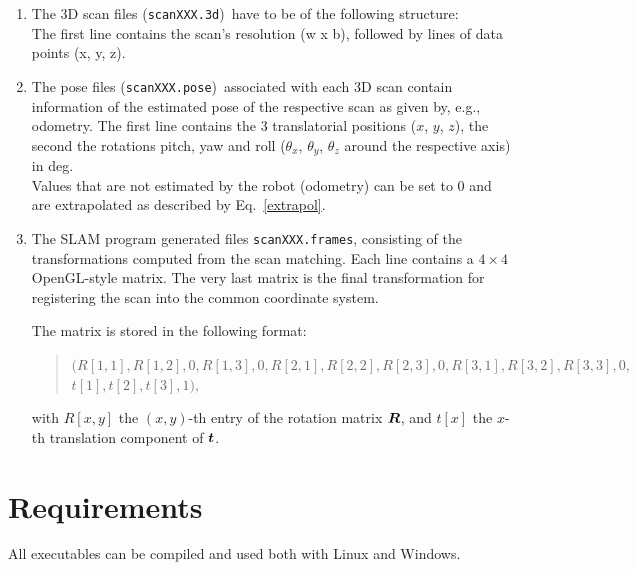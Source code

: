 \documentclass[12pt,dvips]{article}
\renewcommand{\v}[1]{\text{\boldmath $#1$}}
\newcommand{\V}[1]{\text{\boldmath $#1$}}
\newcommand{\M}[1]{\v{#1}}                     %
\begin{document}
{\begin{enumerate}
\item The 3D scan files (\texttt{scanXXX.3d})\footnotemark[1]\
  have to be of the following structure:\\ The first line
  contains the scan's resolution (w x b), followed by lines of
  data points (x, y, z).
%
\item The pose files (\texttt{scanXXX.pose})\footnotemark[1]\ associated with each
  3D scan contain information of the estimated pose of the
  respective scan as given by, e.g., odometry. The first line
  contains the 3 translatorial positions ($x$, $y$, $z$), the
  second the rotations pitch, yaw and roll ($\theta_x$,
  $\theta_y$, $\theta_z$ around the respective axis) in deg.\\
  Values that are not estimated by the robot (odometry) can be
  set to 0 and are extrapolated as described by Eq.~\eqref{extrapol}.
%
\item The SLAM program generated files \texttt{scanXXX.frames},
  consisting of the transformations computed from the scan
  matching. Each line contains a $4 \times 4$ OpenGL-style
  matrix. The very last matrix is the final transformation for
  registering the scan into the common coordinate system.
  
  The matrix is stored in the following format:
  \begin{quote}
  $(R[1,1], R[1,2], 0, R[1,3], 0, R[2,1], R[2,2], R[2,3], 0,
  R[3,1], R[3,2], R[3,3], 0,$\\$t[1], t[2], t[3], 1),$
  \end{quote}
  with $R[x,y]$ the $(x,y)$-th entry of the rotation matrix $\M R$, and
  $t[x]$ the $x$-th translation component of $\V t$.  
\end{enumerate}

\section{Requirements}

All executables can be compiled and used both with Linux and Windows.

}
\end{document}
